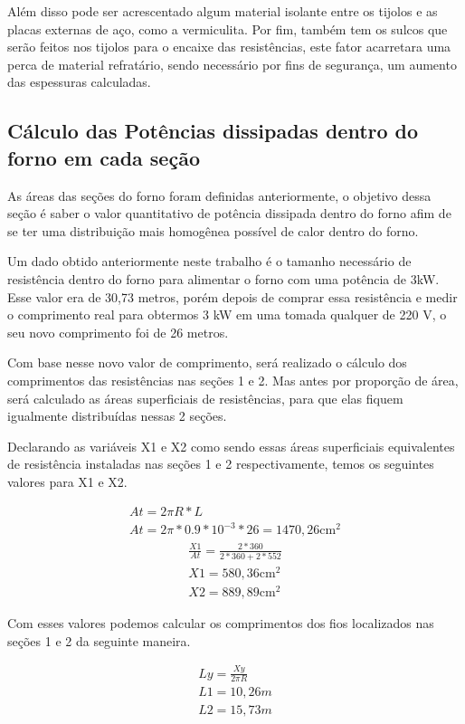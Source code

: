 Além disso pode ser acrescentado algum material isolante entre os tijolos e as placas externas de aço, como a vermiculita.
Por fim, também tem os sulcos que serão feitos nos tijolos para o encaixe das resistências, este fator acarretara uma perca de material refratário, sendo necessário por fins de segurança, um aumento das espessuras calculadas.

\subsection{Cálculo das Potências dissipadas dentro do forno em cada seção}
As áreas das seções do forno foram definidas anteriormente, o objetivo dessa seção é saber o valor quantitativo de potência dissipada dentro do forno afim de se ter uma distribuição mais homogênea possível de calor dentro do forno.

Um dado obtido anteriormente neste trabalho é o tamanho necessário de resistência dentro do forno para alimentar o forno com uma potência de 3kW. Esse valor era de 30,73 metros, porém depois de comprar essa resistência e medir o comprimento real para obtermos 3 kW em uma tomada qualquer de 220 V, o seu novo comprimento foi de 26 metros.

Com base nesse novo valor de comprimento, será realizado o cálculo dos comprimentos das resistências nas seções 1 e 2. Mas antes por proporção de área, será calculado as áreas superficiais de resistências, para que elas fiquem igualmente distribuídas nessas 2 seções.

Declarando as variáveis X1 e X2 como sendo essas áreas superficiais equivalentes de resistência instaladas nas seções 1 e 2 respectivamente, temos os seguintes valores para X1 e X2.

\begin{gather}
    At = 2\pi R*L \\
    At = 2\pi * 0.9 * 10^{-3} * 26 = 1470,26\text{cm}^{2} \nonumber
\end{gather}
\begin{gather}
   \frac{X1}{At} = \frac{2 * 360}{2 * 360 + 2 * 552} \nonumber \\
   X1 = 580,36\text{cm}^{2} \nonumber \\
   X2 = 889,89\text{cm}^{2} \nonumber
\end{gather}

Com esses valores podemos calcular os comprimentos dos fios localizados nas seções 1 e 2 da seguinte maneira.

\begin{gather}
    Ly = \frac{Xy}{2\pi R} \\
    L1 = 10,26m \nonumber \\
    L2 = 15,73m \nonumber
\end{gather}


